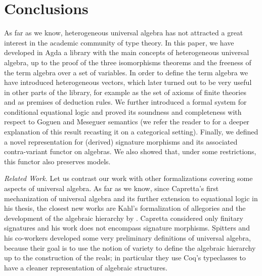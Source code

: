\section{Conclusions}
\label{sec:conclusions}

As far as we know, heterogeneous universal algebra has not attracted a
great interest in the academic community of type theory. In this
paper, we have developed in Agda a library with the main concepts of
heterogeneous universal algebra, up to the proof of the three
isomorphisms theorems and the freeness of the term algebra over a set
of variables. In order to define the term algebra we have introduced
heterogeneous vectors, which later turned out to be very useful in
other parts of the library, for example as the set of axioms of finite
theories and as premises of deduction rules. We further introduced a
formal system for conditional equational logic and proved its
soundness and completeness with respect to Goguen and Meseguer
semantics (we refer the reader to \cite{vidal-06} for a deeper
explanation of this result recasting it on a categorical
setting). Finally, we defined a novel representation for (derived)
signature morphisms and its associated contra-variant functor on
algebras. We also showed that, under some restrictions, this functor
also preserves models.

\textit{Related Work.} Let us contrast our work with other
formalizations covering some aspects of universal algebra. As far as
we know, since Capretta's \citeyearpar{capretta-99} first mechanization of
universal algebra and its further extension to equational logic in his
thesis, the closest new works are Kahl's \citeyearpar{kahl-2011}
formalization of allegories and the development of the algebraic
hierarchy by \cite{spitters-algebraic-11}. Capretta
considered only finitary signatures and his work does not encompass
signature morphisms. Spitters and his co-workers developed some very
preliminary definitions of universal algebra, because their goal is to
use the notion of variety to define the algebraic hierarchy up to the
construction of the reals; in particular they use Coq's typeclasses to
have a cleaner representation of algebraic structures.


